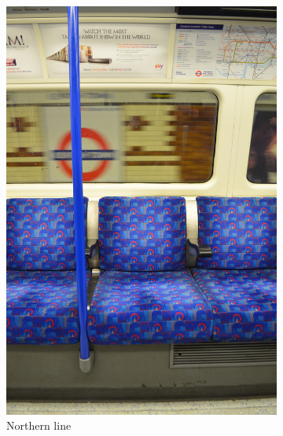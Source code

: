 \begin{figure}[H]
\begin{subfigure}[b]{0.22\textwidth}
        \includegraphics[width=\textwidth]{guidance/images/rathbone2017northern.jpg}
        \caption{Northern line \parencite{rathbone2017northern}}
        \label{fig:rathbone2017northern}
    \end{subfigure}
    \hfill
    \begin{subfigure}[b]{0.22\textwidth}
        \centering

\end{subfigure}
\end{figure}
